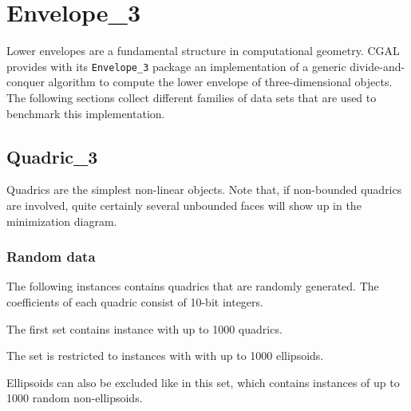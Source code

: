 \chapter{Envelope\_3\label{bi_cha:Envelope3}}

Lower envelopes are a fundamental structure in computational geometry.
CGAL provides with its {\tt Envelope\_3} package an implementation
of a generic divide-and-conquer algorithm to compute the lower envelope
of three-dimensional objects. 
The following sections collect different families of data sets that are used
to benchmark this implementation.

\section{Quadric\_3\label{bi_sec:Envelope3Quadric3}}

Quadrics are the simplest non-linear objects. 
Note that, if non-bounded quadrics
are involved, quite certainly several unbounded faces will show up in the
minimization diagram.

\subsection{Random data\label{bi_subsec:Envelope3Quadric3Randomdata}}

The following instances contains quadrics that are randomly generated. 
The coefficients of each quadric consist of 10-bit integers.

The first set contains instance with up to 1000 quadrics.

The set is restricted to instances with with up to 1000 ellipsoids.

Ellipsoids can also be excluded like in this set, which 
contains instances of up to 1000 random non-ellipsoids.



